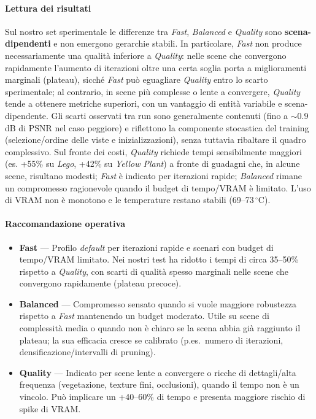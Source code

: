 \paragraph{Lettura dei risultati}
Sul nostro set sperimentale le differenze tra \textit{Fast}, \textit{Balanced} e \textit{Quality} sono
\textbf{scena-dipendenti} e non emergono gerarchie stabili. In particolare, \textit{Fast} non produce
necessariamente una qualità inferiore a \textit{Quality}: nelle scene che convergono rapidamente
l’aumento di iterazioni oltre una certa soglia porta a miglioramenti marginali (plateau), sicché
\textit{Fast} può eguagliare \textit{Quality} entro lo scarto sperimentale; al contrario, in scene più
complesse o lente a convergere, \textit{Quality} tende a ottenere metriche superiori, con un vantaggio
di entità variabile e scena-dipendente. Gli scarti osservati tra run sono generalmente contenuti
(fino a \(\sim 0.9\) dB di PSNR nel caso peggiore) e riflettono la componente stocastica del training
(selezione/ordine delle viste e inizializzazioni), senza tuttavia ribaltare il quadro complessivo.
Sul fronte dei costi, \textit{Quality} richiede tempi sensibilmente maggiori (es. +55\% su \textit{Lego},
+42\% su \textit{Yellow Plant}) a fronte di guadagni che, in alcune scene, risultano modesti; \textit{Fast}
è indicato per iterazioni rapide; \textit{Balanced} rimane un compromesso ragionevole quando il budget
di tempo/VRAM è limitato. L’uso di VRAM non è monotono e le temperature restano stabili
(69--73\,${}^\circ$C).



\paragraph{Raccomandazione operativa}
\begin{itemize}
	\item \textbf{Fast} — Profilo \emph{default} per iterazioni rapide e scenari con budget di tempo/VRAM limitato. Nei nostri test ha ridotto i tempi di circa 35--50\% rispetto a \textit{Quality}, con scarti di qualità spesso marginali nelle scene che convergono rapidamente (plateau precoce).
	\item \textbf{Balanced} — Compromesso sensato quando si vuole maggiore robustezza rispetto a \textit{Fast} mantenendo un budget moderato. Utile su scene di complessità media o quando non è chiaro se la scena abbia già raggiunto il plateau; la sua efficacia cresce se calibrato (p.es.\ numero di iterazioni, densificazione/intervalli di pruning).
	\item \textbf{Quality} — Indicato per scene lente a convergere o ricche di dettagli/alta frequenza (vegetazione, texture fini, occlusioni), quando il tempo non è un vincolo. Può implicare un +40--60\% di tempo e presenta maggiore rischio di spike di VRAM.
\end{itemize}

